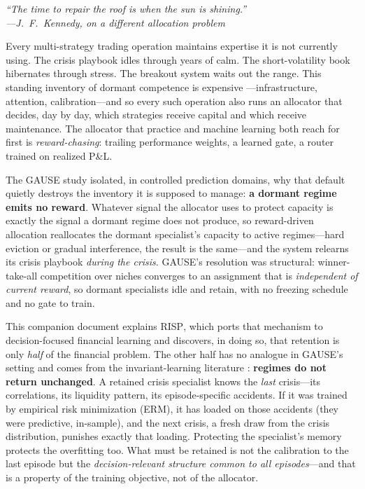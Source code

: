 \documentclass[10pt]{article}
\newcommand{\nm}{\textsc{RISP}}
\begin{document}
\begin{center}
\itshape``The time to repair the roof is when the sun is shining.''\\[2pt]
\normalfont ---J.~F.~Kennedy, on a different allocation problem
\end{center}

Every multi-strategy trading operation maintains expertise it is not
currently using. The crisis playbook idles through years of calm. The
short-volatility book hibernates through stress. The breakout system waits
out the range. This standing inventory of dormant competence is expensive
---infrastructure, attention, calibration---and so every such operation
also runs an allocator that decides, day by day, which strategies receive
capital and which receive maintenance. The allocator that practice and
machine learning both reach for first is \emph{reward-chasing}: trailing
performance weights, a learned gate, a router trained on realized P\&L.

The GAUSE study \cite{li2026gause} isolated, in controlled prediction
domains, why that default quietly destroys the inventory it is supposed to
manage: \textbf{a dormant regime emits no reward}. Whatever signal the
allocator uses to protect capacity is exactly the signal a dormant regime
does not produce, so reward-driven allocation reallocates the dormant
specialist's capacity to active regimes---hard eviction or gradual
interference, the result is the same---and the system relearns its crisis
playbook \emph{during the crisis}. GAUSE's resolution was structural:
winner-take-all competition over niches converges to an assignment that is
\emph{independent of current reward}, so dormant specialists idle and
retain, with no freezing schedule and no gate to train.

This companion document explains \nm{}, which ports that mechanism to
decision-focused financial learning and discovers, in doing so, that
retention is only \emph{half} of the financial problem. The other half has
no analogue in GAUSE's setting and comes from the invariant-learning
literature \cite{arjovsky2019irm, peters2016causal, yan2026invpnco}:
\textbf{regimes do not return unchanged}. A retained crisis specialist
knows the \emph{last} crisis---its correlations, its liquidity pattern,
its episode-specific accidents. If it was trained by empirical risk
minimization (ERM), it has loaded on those accidents (they were
predictive, in-sample), and the next crisis, a fresh draw from the crisis
distribution, punishes exactly that loading. Protecting the specialist's
memory protects the overfitting too. What must be retained is not the
calibration to the last episode but the \emph{decision-relevant structure
common to all episodes}---and that is a property of the training
objective, not of the allocator.
\end{document}
